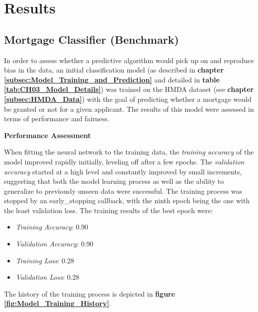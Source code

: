 \section{Results}\label{sec:Results}

\subsection{Mortgage Classifier (Benchmark)}\label{subsec:Mortgage Classifier (Benchmark) Results}

In order to assess whether a predictive algorithm would pick up on and reproduce bias in the data, an initial classification model (as described in \textbf{chapter \ref{subsec:Model_Training_and_Prediction}} and detailed in \textbf{table \ref{tab:CH03_Model_Details}}) was trained on the HMDA dataset (see \textbf{chapter \ref{subsec:HMDA_Data}}) with the goal of predicting whether a mortgage would be granted or not for a given applicant.
The results of this model were assessed in terms of performance and fairness.

\textbf{Performance Assessment}

When fitting the neural network to the training data, the \textit{training accuracy} of the model improved rapidly initially, leveling off after a few epochs. The \textit{validation accuracy} started at a high level and constantly improved by small increments, suggesting that both the model learning process as well as the ability to generalize to previously unseen data were successful. 
The training process was stopped by an early\_stopping callback, with the ninth epoch being the one with the least validation loss. The training results of the best epoch were:
\begin{itemize}
    \item \textit{Training Accuracy}: 0.90
    \item \textit{Validation Accuracy}: 0.90
    \item \textit{Training Loss}: 0.28
    \item \textit{Validation Loss}: 0.28
\end{itemize}
The history of the training process is depicted in \textbf{figure \ref{fig:Model_Training_History}}.

